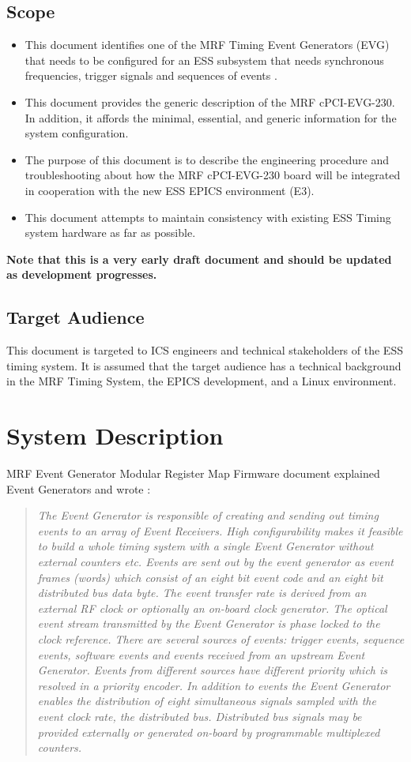 \documentclass[11pt
  , a4paper
  , article
  , oneside
  , showtrims
]{memoir}
\begin{document}
\section{Scope}
\begin{itemize}
\item This document identifies one of the MRF Timing Event Generators (EVG) that needs to be configured for an ESS subsystem that needs synchronous frequencies, trigger signals and sequences of events \cite{MRFEVENTGENERATOR}.
\item This document provides the generic description of the MRF cPCI-EVG-230. In addition, it affords the minimal, essential, and generic information for the system configuration.
\item The purpose of this document is to describe the engineering procedure and troubleshooting about how the MRF cPCI-EVG-230 board will be integrated in cooperation with the new ESS EPICS environment (E3).
\item This document attempts to maintain consistency with existing ESS Timing system hardware as far as possible.
\end{itemize}
\textbf{Note that this is a very early draft document and should be updated as development progresses.}

\section{Target Audience}
This document is targeted to ICS engineers and technical stakeholders of the ESS timing system. It is assumed that the target audience has a technical background in the MRF Timing System, the EPICS development, and a Linux environment.

\chapter{System Description}
MRF Event Generator Modular Register Map Firmware document \citep[see][p4]{MRFEVENTGENERATOR} explained Event Generators and wrote :
\blockquote{\textit{The Event Generator is responsible of creating and sending out timing events to an array of Event Receivers.
High configurability makes it feasible to build a whole timing system with a single Event Generator without external counters etc.
Events are sent out by the event generator as event frames (words) which consist of an eight bit event code and an eight bit distributed bus data byte. The event transfer rate is derived from an external RF clock or optionally an on-board clock generator. The optical event stream transmitted by the Event Generator is phase locked to the clock reference.
There are several sources of events: trigger events, sequence events, software events and events received from an upstream Event Generator. Events from different sources have different priority which is resolved in a priority encoder.
In addition to events the Event Generator enables the distribution of eight simultaneous signals sampled with the event clock rate, the distributed bus. Distributed bus signals may be provided externally or generated on-board by programmable multiplexed counters.}}
\end{document}
